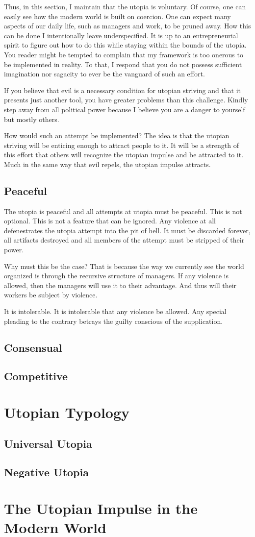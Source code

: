 \documentclass[12pt]{article}
\begin{document}
Thus, in this section, I maintain that the utopia is voluntary.
Of course, one can easily see how the modern world is built on coercion.
One can expect many aspects of our daily life, such as managers and work, to be pruned away.
How this can be done I intentionally leave underspecified.
It is up to an entrepreneurial spirit to figure out how to do this while staying within the bounds of the utopia.
You reader might be tempted to complain that my framework is too onerous to be implemented in reality.
To that, I respond that you do not possess sufficient imagination nor sagacity to ever be the vanguard of such an effort.

If you believe that evil is a necessary condition for utopian striving and that it presents just another tool, you have greater problems than this challenge.
Kindly step away from all political power because I believe you are a danger to yourself but mostly others.

How would such an attempt be implemented?
The idea is that the utopian striving will be enticing enough to attract people to it.
It will be a strength of this effort that others will recognize the utopian impulse and be attracted to it.
Much in the same way that evil repels, the utopian impulse attracts.

\subsection{Peaceful}
The utopia is peaceful and all attempts at utopia must be peaceful.
This is not optional.
This is not a feature that can be ignored.
Any violence at all defenestrates the utopia attempt into the pit of hell.
It must be discarded forever, all artifacts destroyed and all members of the attempt must be stripped of their power.

Why must this be the case?
That is because the way we currently see the world organized is through the recursive structure of managers.
If any violence is allowed, then the managers will use it to their advantage.
And thus will their workers be subject by violence.

It is intolerable.
It is intolerable that any violence be allowed.
Any special pleading to the contrary betrays the guilty conscious of the supplication.


\subsection{Consensual}

\subsection{Competitive}

\section{Utopian Typology}
\subsection{Universal Utopia}
\subsection{Negative Utopia}

\section{The Utopian Impulse in the Modern World}
\end{document}
